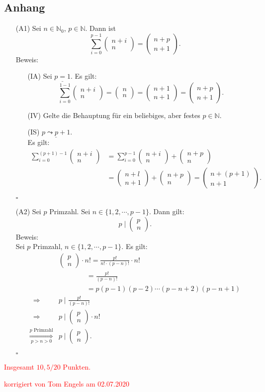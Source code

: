 \documentclass[12pt]{article}
\newcommand{\corr}[1]{\textcolor{red}{#1}}
\newcommand{\QED}{\begin{flushright} $\square$ \end{flushright}}
\newcommand{\df}{\enspace\Longrightarrow\enspace}
\newcommand{\koeff}[2]{\begin{pmatrix}#1 \\ #2\end{pmatrix}}
\begin{document}
\subsection*{Anhang}
\begin{enumerate}
	\item[(A1)] Sei $n\in\mathbb{N}_0$, $p\in\mathbb{N}$. Dann ist $$\sum_{i=0}^{p-1}\koeff{n+i}{n}=\koeff{n+p}{n+1}.$$
	Beweis:
	\begin{enumerate}
		\item[(IA)] Sei $\underline{p=1}$. Es gilt:
		$$\sum_{i=0}^{1-1}\koeff{n+i}{n}=\koeff{n}{n}=\koeff{n+1}{n+1}=\koeff{n+p}{n+1}.$$
		
		\item[(IV)] Gelte die Behauptung für ein beliebiges, aber festes $p\in\mathbb{N}$.
		
		\item[(IS)] $\underline{p\leadsto p+1}$. \\
		Es gilt:
		\begin{align*}
			\sum_{i=0}^{(p+1)-1}\koeff{n+i}{n}&=\sum_{i=0}^{p-1}\koeff{n+i}{n}+\koeff{n+p}{n} \\
			&=\koeff{n+l}{n+1}+\koeff{n+p}{n}=\koeff{n+(p+1)}{n+1}.
		\end{align*}
	\end{enumerate}
	\QED
	
	\item[(A2)] Sei $p$ Primzahl. Sei $n\in\{1,2,\cdots,p-1\}$. Dann gilt: $$p\mid\koeff{p}{n}.$$
	 Beweis: \\
	 Sei $p$ Primzahl, $n\in\{1,2,\cdots,p-1\}$. Es gilt:
	 \begin{align*}
	 	&\koeff{p}{n}\cdot n!=\frac{p!}{n!\cdot(p-n)!}\cdot n! \\
	 	&\quad\quad\quad\quad=\frac{p!}{(p-n)!} \\
	 	&\quad\quad\quad\quad=p(p-1)(p-2)\cdots(p-n+2)(p-n+1) \\
	 	\df& p\mid\frac{p!}{(p-n)!} \\
	 	\df& p\mid\koeff{p}{n}\cdot n! \\
	 	\overset{p\text{ Primzahl}}{\underset{p>n>0}{\df}}&p\mid\koeff{p}{n}.
	 \end{align*}
	 \QED
\end{enumerate}

\bigskip

\corr{Insgesamt $10,5/20$ Punkten.}


\bigskip

\corr{korrigiert von Tom Engels am 02.07.2020}
\end{document}
